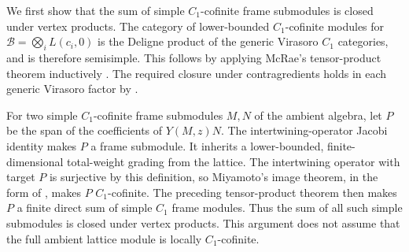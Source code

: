 \documentclass[11pt,a4paper]{article}
\numberwithin{equation}{section}
\theoremstyle{definition}\newtheorem{definition}[theorem]{Definition}
\theoremstyle{remark}\newtheorem{remark}[theorem]{Remark}
\begin{document}
We first show that the sum of simple $C_1$-cofinite frame submodules
is closed under vertex products. The category of lower-bounded
$C_1$-cofinite modules for $\mathcal B=\bigotimes_iL(c_i,0)$ is the
Deligne product of the generic Virasoro $C_1$ categories, and is
therefore semisimple. This follows by applying McRae's tensor-product
theorem inductively \cite[Theorems 3.7 and 4.13]{c:McRaeDeligne}.
The required closure under contragredients holds in each generic
Virasoro factor by \cite{virasoro}.

For two simple $C_1$-cofinite frame submodules $M,N$ of the ambient
algebra, let $P$ be the span of the coefficients of $Y(M,z)N$.
The intertwining-operator Jacobi identity makes $P$ a frame submodule.
It inherits a lower-bounded, finite-dimensional total-weight grading
from the lattice.  The intertwining operator with target $P$ is
surjective by this definition, so Miyamoto's image theorem, in the form of \cite[Corollary 2.14]{cmy}, makes
$P$ $C_1$-cofinite.  The preceding tensor-product theorem then makes
$P$ a finite direct sum of simple $C_1$ frame modules.  Thus the sum
of all such simple submodules is closed under vertex products.  This
argument does not assume that the full ambient lattice module is
locally $C_1$-cofinite.
\end{document}
